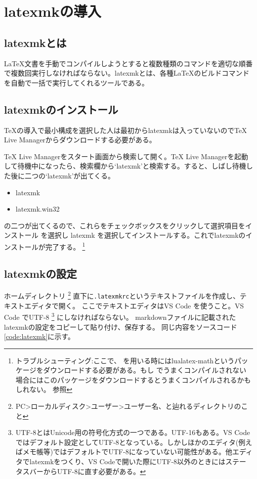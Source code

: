 \documentclass[titlepage]{ltjsarticle}
\begin{document}
\section{latexmkの導入} 
\subsection{latexmkとは}
\LaTeX 文書を手動でコンパイルしようとすると複数種類のコマンドを適切な順番で複数回実行しなければならない。latexmkとは、各種\LaTeX のビルドコマンドを自動で一括で実行してくれるツールである。

\subsection{latexmkのインストール}

TeXの導入で最小構成を選択した人は最初からlatexmkは入っていないのでTeX Live Managerからダウンロードする必要がある。

TeX Live Managerをスタート画面から検索して開く。TeX Live Managerを起動して待機中になったら、検索欄から`latexmk'と検索する。すると、しばし待機した後に二つの`latexmk'が出てくる。
\begin{itemize}
  \item latexmk
  \item latexmk.win32
\end{itemize}
の二つが出てくるので、これらをチェックボックスをクリックして選択項目をインストール を選択し latexmk を選択してインストールする。これでlatexmkのインストールが完了する。
\footnote{トラブルシューティング:ここで、\LuaLaTeX 
を用いる時にはlualatex-mathというパッケージをダウンロードする必要がある。もし\LuaLaTeX 
でうまくコンパイルされない場合にはこのパッケージをダウンロードするとうまくコンパイルされるかもしれない。
\cite{TeXliveトラブルシューティングlualatex}参照}

\subsection{latexmkの設定}
ホームディレクトリ
\footnote{
  PC>ローカルディスク>ユーザー>ユーザー名、と辿れるディレクトリのこと
}
直下に\verb|.latexmkrc|というテキストファイルを作成し、テキストエディタで開く。
ここでテキストエディタはVS Code を使うこと。VS Code でUTF-8
\footnote{UTF-8とはUnicode用の符号化方式の一つである。UTF-16もある。VS Codeではデフォルト設定としてUTF-8となっている。しかしほかのエディタ(例えばメモ帳等)ではデフォルトでUTF-8になっていない可能性がある。他エディタでlatexmkをつくり、VS Codeで開いた際にUTF-8以外のときにはステータスバーからUTF-8に直す必要がある。\cite{VSCodeの文字コード}}
にしなければならない。
markdownファイルに記載されたlatexmkの設定をコピーして貼り付け、保存する。
同じ内容をソースコード\ref{code:latexmk}に示す。
\end{document}
